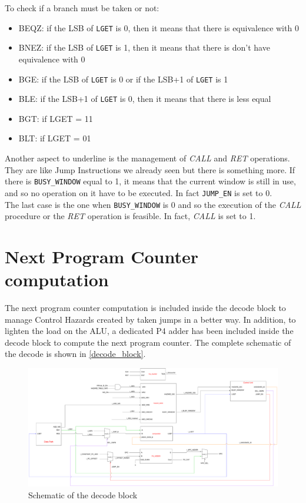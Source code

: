 To check if a branch must be taken or not:
\begin{itemize}
  \item BEQZ: if the LSB of \texttt{LGET} is 0, then it means that there is equivalence with 0
  \item BNEZ: if the LSB of \texttt{LGET} is 1, then it means that there is don't have equivalence with 0
  \item BGE: if the LSB of \texttt{LGET} is 0 or if the LSB+1 of \texttt{LGET} is 1
  \item BLE: if the LSB+1 of \texttt{LGET} is 0, then it means that there is less equal
  \item BGT: if LGET = 11
  \item BLT: if LGET = 01
\end{itemize}

Another aspect to underline is the management of \emph{CALL} and \emph{RET} operations. They are like Jump Instructions we already seen but there is something more. If there is \texttt{BUSY\_WINDOW} equal to 1, it means that the current window is still in use, and so no operation on it have to be executed. In fact \texttt{JUMP\_EN} is set to 0.\\

The last case is the one when \texttt{BUSY\_WINDOW} is 0 and so the execution of the \emph{CALL} procedure or the \emph{RET} operation is feasible. In fact, \emph{CALL} is set to 1.

\section{Next Program Counter computation}
The next program counter computation is included inside the decode block to manage Control Hazards created by taken jumps in a better way. In addition, to lighten the load on the ALU, a dedicated P4 adder has been included inside the decode block to compute the next program counter. 
The complete schematic of the decode is shown in \autoref{decode_block}.

\begin{figure}[H]
	\centering
  \addtolength{\leftskip}{-3cm}
  \addtolength{\rightskip}{-3cm}
	\includegraphics[width=1.2\textwidth]{chapters/4_DecodeStage/images/decode_block.pdf}
	\caption{Schematic of the decode block}
	\label{decode_block}
\end{figure}

